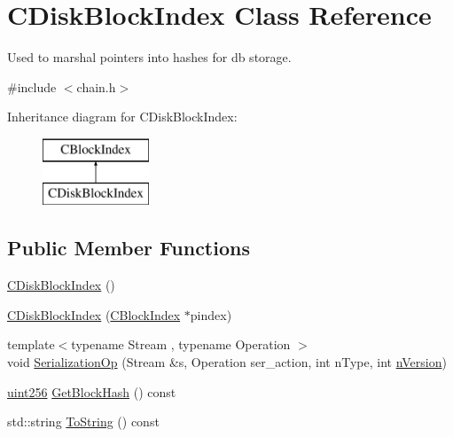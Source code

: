 \hypertarget{class_c_disk_block_index}{}\section{C\+Disk\+Block\+Index Class Reference}
\label{class_c_disk_block_index}


Used to marshal pointers into hashes for db storage.  




{\ttfamily \#include $<$chain.\+h$>$}

Inheritance diagram for C\+Disk\+Block\+Index\+:\begin{figure}[H]
\begin{center}
\leavevmode
\includegraphics[height=2.000000cm]{class_c_disk_block_index}
\end{center}
\end{figure}
\subsection*{Public Member Functions}
\begin{DoxyCompactItemize}
\item 
\hyperlink{class_c_disk_block_index_a8c460c63b799964ef55e2dbbb74b5ad6}{C\+Disk\+Block\+Index} ()
\item 
\hyperlink{class_c_disk_block_index_a1407006c4526260b57ec2d8b3abc707d}{C\+Disk\+Block\+Index} (\hyperlink{class_c_block_index}{C\+Block\+Index} $\ast$pindex)
\item 
{\footnotesize template$<$typename Stream , typename Operation $>$ }\\void \hyperlink{class_c_disk_block_index_a2ef7b51f2777fcc1b9625a0ee000f9b5}{Serialization\+Op} (Stream \&s, Operation ser\+\_\+action, int n\+Type, int \hyperlink{class_c_block_index_a45126301a0a6e26010527a7bbfc1ef58}{n\+Version})
\item 
\hyperlink{classuint256}{uint256} \hyperlink{class_c_disk_block_index_adbe404c55c68be782360b4594d355fad}{Get\+Block\+Hash} () const 
\item 
std\+::string \hyperlink{class_c_disk_block_index_a86ef9d71fb72868699145b73f3e3e583}{To\+String} () const 
\end{DoxyCompactItemize}
